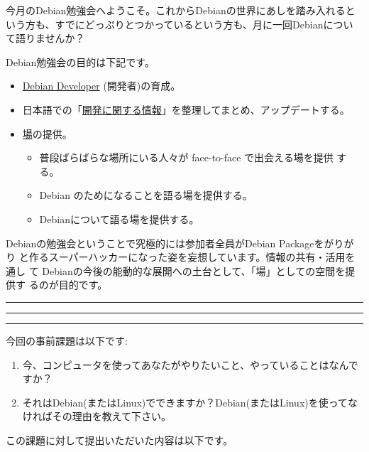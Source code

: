 \documentclass[mingoth,a4paper]{jsarticle}
\begin{document}
\begin{multicols}{2}
 

 今月のDebian勉強会へようこそ。これからDebianの世界にあしを踏み入れると
 いう方も、すでにどっぷりとつかっているという方も、月に一回Debianについ
 て語りませんか？

 Debian勉強会の目的は下記です。

 \begin{itemize}
 \item \underline{Debian Developer} (開発者)の育成。
 \item 日本語での「\underline{開発に関する情報}」を整理してまとめ、アップデートする。
 \item \underline{場}の提供。
 \begin{itemize}
  \item 普段ばらばらな場所にいる人々が face-to-face で出会える場を提供
	する。
  \item Debian のためになることを語る場を提供する。
  \item Debianについて語る場を提供する。
 \end{itemize}
 \end{itemize}		

 Debianの勉強会ということで究極的には参加者全員がDebian Packageをがりがり
 と作るスーパーハッカーになった姿を妄想しています。情報の共有・活用を通し
 て Debianの今後の能動的な展開への土台として、「場」としての空間を提供す
 るのが目的です。

\end{multicols}

\newpage

\begin{minipage}[b]{0.2\hsize}
 \colorbox{titleback}{}
\end{minipage}
\begin{minipage}[b]{0.8\hsize}
\hrule
\vspace{2mm}
\hrule
\begin{multicols}{2}
\tableofcontents
\end{multicols}
\vspace{2mm}
\hrule
\end{minipage}


今回の事前課題は以下です:
\begin{enumerate}
 \item 今、コンピュータを使ってあなたがやりたいこと、やっていることはなんですか？
 \item それはDebian(またはLinux)でできますか？Debian(またはLinux)を使ってなければその理由を教えて下さい。
\end{enumerate}
この課題に対して提出いただいた内容は以下です。
\begin{multicols}{2}
{\footnotesize
 
}
\end{multicols}
\end{document}
